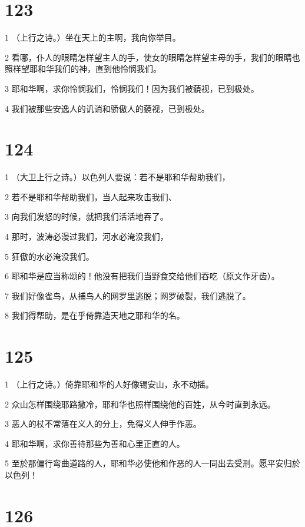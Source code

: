 \chapter{123}

\par 1 （上行之诗。）坐在天上的主啊，我向你举目。
\par 2 看哪，仆人的眼睛怎样望主人的手，使女的眼睛怎样望主母的手，我们的眼睛也照样望耶和华我们的神，直到他怜悯我们。
\par 3 耶和华啊，求你怜悯我们，怜悯我们！因为我们被藐视，已到极处。
\par 4 我们被那些安逸人的讥诮和骄傲人的藐视，已到极处。

\chapter{124}

\par 1 （大卫上行之诗。）以色列人要说：若不是耶和华帮助我们，
\par 2 若不是耶和华帮助我们，当人起来攻击我们、
\par 3 向我们发怒的时候，就把我们活活地吞了。
\par 4 那时，波涛必漫过我们，河水必淹没我们，
\par 5 狂傲的水必淹没我们。
\par 6 耶和华是应当称颂的！他没有把我们当野食交给他们吞吃（原文作牙齿）。
\par 7 我们好像雀鸟，从捕鸟人的网罗里逃脱；网罗破裂，我们逃脱了。
\par 8 我们得帮助，是在乎倚靠造天地之耶和华的名。

\chapter{125}

\par 1 （上行之诗。）倚靠耶和华的人好像锡安山，永不动摇。
\par 2 众山怎样围绕耶路撒冷，耶和华也照样围绕他的百姓，从今时直到永远。
\par 3 恶人的杖不常落在义人的分上，免得义人伸手作恶。
\par 4 耶和华啊，求你善待那些为善和心里正直的人。
\par 5 至於那偏行弯曲道路的人，耶和华必使他和作恶的人一同出去受刑。愿平安归於以色列！

\chapter{126}

